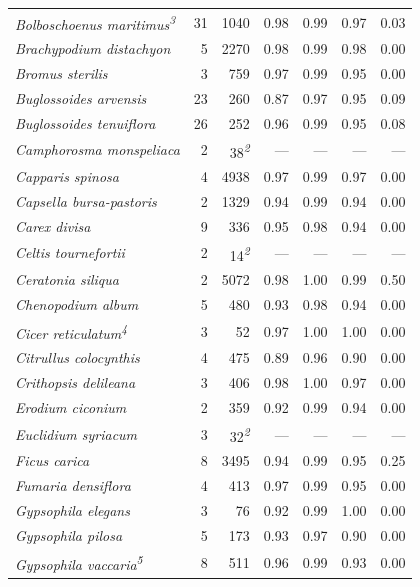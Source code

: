 \documentclass[
  authoryear,
  preprint]{elsarticle}
\begin{document}
\begin{longtable}{@{\extracolsep{\fill}}lrrrrrr}
{\itshape Bolboschoenus maritimus}\textsuperscript{\textit{3}} & 31 & 1040 & 0.98 & 0.99 & 0.97 & 0.03 \\ 
{\itshape Brachypodium distachyon} & 5 & 2270 & 0.98 & 0.99 & 0.98 & 0.00 \\ 
{\itshape Bromus sterilis} & 3 & 759 & 0.97 & 0.99 & 0.95 & 0.00 \\ 
{\itshape Buglossoides arvensis} & 23 & 260 & 0.87 & 0.97 & 0.95 & 0.09 \\ 
{\itshape Buglossoides tenuiflora} & 26 & 252 & 0.96 & 0.99 & 0.95 & 0.08 \\ 
{\itshape Camphorosma monspeliaca} & 2 & 38\textsuperscript{\textit{2}} & — & — & — & — \\ 
{\itshape Capparis spinosa} & 4 & 4938 & 0.97 & 0.99 & 0.97 & 0.00 \\ 
{\itshape Capsella bursa-pastoris} & 2 & 1329 & 0.94 & 0.99 & 0.94 & 0.00 \\ 
{\itshape Carex divisa} & 9 & 336 & 0.95 & 0.98 & 0.94 & 0.00 \\ 
{\itshape Celtis tournefortii} & 2 & 14\textsuperscript{\textit{2}} & — & — & — & — \\ 
{\itshape Ceratonia siliqua} & 2 & 5072 & 0.98 & 1.00 & 0.99 & 0.50 \\ 
{\itshape Chenopodium album} & 5 & 480 & 0.93 & 0.98 & 0.94 & 0.00 \\ 
{\itshape Cicer reticulatum}\textsuperscript{\textit{4}} & 3 & 52 & 0.97 & 1.00 & 1.00 & 0.00 \\ 
{\itshape Citrullus colocynthis} & 4 & 475 & 0.89 & 0.96 & 0.90 & 0.00 \\ 
{\itshape Crithopsis delileana} & 3 & 406 & 0.98 & 1.00 & 0.97 & 0.00 \\ 
{\itshape Erodium ciconium} & 2 & 359 & 0.92 & 0.99 & 0.94 & 0.00 \\ 
{\itshape Euclidium syriacum} & 3 & 32\textsuperscript{\textit{2}} & — & — & — & — \\ 
{\itshape Ficus carica} & 8 & 3495 & 0.94 & 0.99 & 0.95 & 0.25 \\ 
{\itshape Fumaria densiflora} & 4 & 413 & 0.97 & 0.99 & 0.95 & 0.00 \\ 
{\itshape Gypsophila elegans} & 3 & 76 & 0.92 & 0.99 & 1.00 & 0.00 \\ 
{\itshape Gypsophila pilosa} & 5 & 173 & 0.93 & 0.97 & 0.90 & 0.00 \\ 
{\itshape Gypsophila vaccaria}\textsuperscript{\textit{5}} & 8 & 511 & 0.96 & 0.99 & 0.93 & 0.00 \\ 

\end{longtable}
\end{document}

